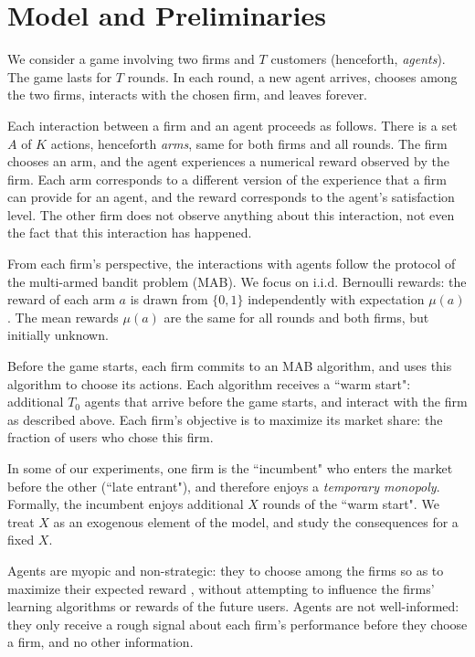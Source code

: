 \documentclass[../competing_bandits.tex]{subfiles}
\begin{document}
\section{Model and Preliminaries}\label{sec:model}

We consider a game involving two firms and $T$ customers (henceforth, \emph{agents}). The game lasts for $T$ rounds. In each round, a new agent arrives, chooses among the two firms, interacts with the chosen firm, and leaves forever.

Each interaction between a firm and an agent proceeds as follows. There is a set $A$ of $K$ actions, henceforth \emph{arms}, same for both firms and all rounds. The firm chooses an arm, and the agent experiences a numerical reward observed by the firm. Each arm corresponds to a different version of the experience that a firm can provide for an agent, and the reward corresponds to the agent's satisfaction level. The other firm does not observe anything about this interaction, not even the fact that this interaction has happened.

From each firm's perspective, the interactions with agents follow the protocol of the multi-armed bandit problem (MAB). We focus on i.i.d. Bernoulli rewards: the  reward of each arm $a$ is drawn from $\{0,1\}$ independently with expectation $\mu(a)$. The mean rewards $\mu(a)$ are the same for all rounds and both firms, but initially unknown.

Before the game starts, each firm commits to an MAB algorithm, and uses this algorithm to choose its actions. Each algorithm receives a ``warm start": additional $T_0$ agents that arrive before the game starts, and interact with the firm as described above.  Each firm's objective is to maximize its market share: the fraction of users who chose this firm.

In some of our experiments, one firm is the ``incumbent" who enters the market before the other (``late entrant"), and therefore enjoys a \emph{temporary monopoly}. Formally, the incumbent enjoys additional $X$ rounds of the ``warm start". We treat $X$ as an exogenous element of the model, and study the consequences for a fixed $X$.



Agents are myopic and non-strategic: they  to choose among the firms so as to maximize their expected reward , without attempting to influence the firms' learning algorithms or rewards of the future users. Agents are not well-informed: they only receive a rough signal about each firm's performance before they choose a firm, and no other information.
\end{document}
